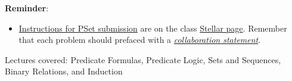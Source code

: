\documentclass[handout]{mcs}
\begin{document}
\renewcommand{\reading}{
\begin{itemize}
\item Chapter~\bref{predicate_sec}{.\ \emph{Predicate Formulas}},
\item Chapter~\bref{data_chap}{.\ \emph{Mathematical Data
Types} through \bref{rel_sec}{.\ \emph{Binary Relations}}},
\item Chapter~\bref{induction_chap}{.\ \emph{Induction}}.

\end{itemize}
These assigned readings do \textbf{not}
  include the Problem sections.  (Many of the problems in the text
  will appear as class or homework problems.)}


\medskip

\textbf{Reminder}:

\begin{itemize}

\item
  \href{https://courses.csail.mit.edu/6.042/spring17/pset_instructions}
       {Instructions for PSet submission} are on the class
       \href{https://stellar.mit.edu/S/course/6/sp17/6.042/}{Stellar
         page}.  Remember that each problem should prefaced with a
       \href{http://courses.csail.mit.edu/6.042/spring17/pset_instructions.shtml#collab-state}
            {\emph{collaboration statement}}.
\end{itemize}

\begin{staffnotes}
Lectures covered: Predicate Formulas, Predicate Logic, Sets and Sequences, Binary Relations, and Induction 
\end{staffnotes}







\end{document}
